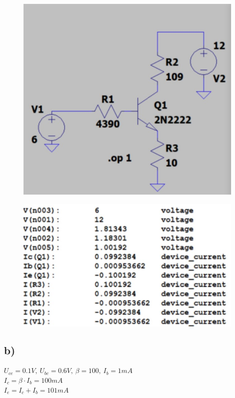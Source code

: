 \documentclass{article}
\begin{document}
\begin{figure}[h!]
    \centering
    \includegraphics[scale=0.5]{rys3_model.jpg}
\end{figure}


\begin{figure}
    \centering
    \includegraphics[scale=0.35]{rys3_num.jpg}
\end{figure}

\newpage


\subsection{b)}

$U_{ce} = 0.1V, \ U_{bc} = 0.6V, \ \beta = 100, \ I_{b} = 1mA$\\
$I_{c}=\beta \cdot I_{b} = 100 mA$\\
$I_{e} = I_{c} + I_{b} = 101mA$
\end{document}

